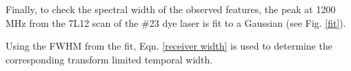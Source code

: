 Finally, to check the spectral width of the observed features, the peak at 1200 MHz from the 7L12 scan of the \#23 dye laser is fit to a Gaussian (see Fig. \ref{fit}).

Using the FWHM from the fit, Eqn. \ref{receiver width} is used to determine the corresponding transform limited temporal width.
